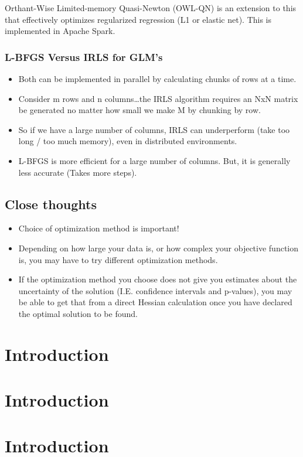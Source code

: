 \documentclass[fontset=fandol,zihao=false,scheme=chinese,heading=true,UTF8]{ctexbook}
\providecommand{\tightlist}{%
  \setlength{\itemsep}{0pt}\setlength{\parskip}{0pt}}
\begin{document}
Orthant-Wise Limited-memory Quasi-Newton (OWL-QN) is an extension to this that effectively optimizes regularized regression (L1 or elastic net). This is implemented in Apache Spark.

\hypertarget{l-bfgs-versus-irls-for-glms}{%
\subsection{L-BFGS Versus IRLS for GLM's}\label{l-bfgs-versus-irls-for-glms}}

\begin{itemize}
\tightlist
\item
  Both can be implemented in parallel by calculating chunks of rows at a time.
\item
  Consider m rows and n columns\ldots{}the IRLS algorithm requires an NxN matrix be generated no matter how small we make M by chunking by row.
\item
  So if we have a large number of columns, IRLS can underperform (take too long / too much memory), even in distributed environments.
\item
  L-BFGS is more efficient for a large number of columns. But, it is generally less accurate (Takes more steps).
\end{itemize}

\hypertarget{close-thoughts}{%
\section{Close thoughts}\label{close-thoughts}}

\begin{itemize}
\tightlist
\item
  Choice of optimization method is important!
\item
  Depending on how large your data is, or how complex your objective function is, you may have to try different optimization methods.
\item
  If the optimization method you choose does not give you estimates about the uncertainty of the solution (I.E. confidence intervals and p-values), you may be able to get that from a direct Hessian calculation once you have declared the optimal solution to be found.
\end{itemize}

\hypertarget{introduction-1}{%
\chapter{Introduction}\label{introduction-1}}

\hypertarget{introduction-2}{%
\chapter{Introduction}\label{introduction-2}}

\hypertarget{introduction-3}{%
\chapter{Introduction}\label{introduction-3}}




\backmatter
\printindex
\end{document}
